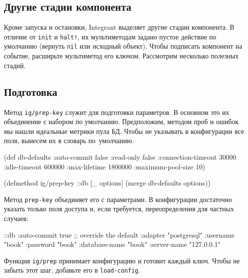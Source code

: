 \subsection{Другие стадии компонента}


Кроме запуска и остановки, Integrant выделяет другие стадии компонента. В
отличие от \verb|init| и \verb|halt!|, их мультиметодам задано пустое действие
по умолчанию (вернуть \verb|nil| или исходный объект). Чтобы подписать компонент
на событие, расширьте мультиметод его ключом. Рассмотрим несколько полезных
стадий.

\subsection{Подготовка}

Метод \verb|ig/prep-key| служит для подготовки параметров. В основном это их
объединение с набором по умолчанию. Предположим, методом проб и ошибок мы нашли
идеальные метрики пула БД. Чтобы не указывать в конфигурации все поля, вынесем
их в словарь по~умолчанию.

\begin{english}
  \begin{clojure}
(def db-defaults
  {:auto-commit        false
   :read-only          false
   :connection-timeout 30000
   :idle-timeout       600000
   :max-lifetime       1800000
   :maximum-pool-size  10})

(defmethod ig/prep-key ::db
  [_ options]
  (merge db-defaults options))
  \end{clojure}
\end{english}

Метод \verb|prep-key| объединяет его с параметрами. В конфигурации достаточно
указать только поля доступа и, если требуется, переопределения для частных
случаев:

\begin{english}
  \begin{clojure}
{::db {:auto-commit   true ;; override the default
       :adapter       "postgresql"
       :username      "book"
       :password      "book"
       :database-name "book"
       :server-name   "127.0.0.1"}}
  \end{clojure}
\end{english}

Функция \verb|ig/prep| принимает конфигурацию и готовит каждый ключ. Чтобы не
забыть этот шаг, добавьте его в \verb|load-config|.

